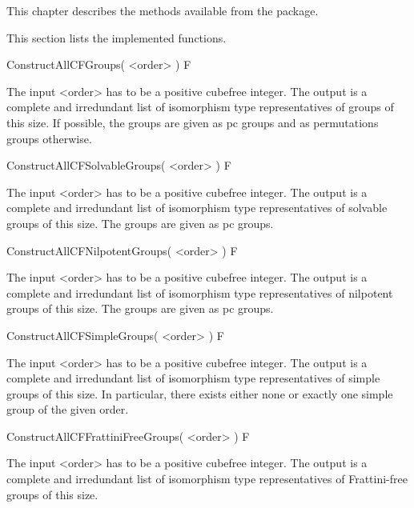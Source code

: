 


This chapter describes the methods available from the {\Cubefree} package.




This section lists the implemented functions.


\>ConstructAllCFGroups( <order> ) F

The input <order> has to be a positive cubefree integer. The output is a complete and irredundant list of isomorphism
type representatives of groups of this size. If possible, the groups are given
as pc groups and as permutations groups otherwise.

\>ConstructAllCFSolvableGroups( <order> ) F

The input <order> has to be a positive cubefree integer. The output is a complete and irredundant list of isomorphism
type representatives of solvable groups of this size. The groups are given as pc groups.

\>ConstructAllCFNilpotentGroups( <order> ) F

The input <order> has to be a positive cubefree integer. The output is a complete and irredundant list of isomorphism
type representatives of nilpotent groups of this size. The groups are given as pc groups.

\>ConstructAllCFSimpleGroups( <order> ) F

The input <order> has to be a positive cubefree integer. The output is a complete and irredundant list of isomorphism
type representatives of simple groups of this size. In particular, there
exists either none or exactly one simple group of the given order.

\>ConstructAllCFFrattiniFreeGroups( <order> ) F

The input <order> has to be a positive cubefree integer. The output is a complete and irredundant list of isomorphism
type representatives of Frattini-free groups of this size.



